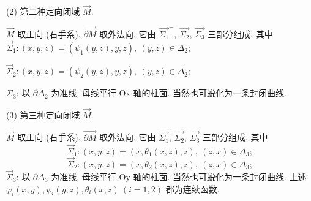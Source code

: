 \begin{figure}[htbp]
\begin{minipage}[b]{0.48\linewidth}
    \caption{}\label{fig:11.4.7}
  \end{minipage}
\end{figure}

(2) 第二种定向闭域 $\overrightarrow{M}$.

$\overrightarrow{M}$ 取正向 (右手系), $\overrightarrow{\partial M}$ 取外法向. 它由 $\overrightarrow{\Sigma_{1}}^{-}$, $\overrightarrow{\Sigma_{2}}$, $\overrightarrow{\Sigma_{3}}$ 三部分组成, 其中 $\overrightarrow{\Sigma}_{1}:(x,y,z)=(\psi_{1}(y,z),y,z),\ (y,z)\in\Delta_{2}$;

$\overrightarrow{\Sigma}_{2}:(x,y,z)=(\psi_{2}(y,z),y,z),\ (y,z)\in\Delta_{2}$;

$\Sigma_{3}$: 以 $\partial\Delta_{2}$ 为准线, 母线平行 Ox 轴的柱面. 当然也可蜕化为一条封闭曲线.

(3) 第三种定向闭域 $\overrightarrow{M}$.

$\overrightarrow{M}$ 取正向 (右手系), $\overrightarrow{\partial M}$ 取外法向. 它由 $\overrightarrow{\Sigma_{1}}$, $\overrightarrow{\Sigma_{2}}$, $\overrightarrow{\Sigma_{3}}$ 三部分组成, 其中
\[
\overrightarrow{\Sigma}_{1}:(x,y,z)=(x,\theta_{1}(x,z),z),\ (z,x)\in\Delta_{3};
\]
\[
\overrightarrow{\Sigma}_{2}:(x,y,z)=(x,\theta_{2}(x,z),z),\ (z,x)\in\Delta_{3};
\]
$\overrightarrow{\Sigma}_{3}$: 以 $\partial\Delta_{3}$ 为准线, 母线平行 Oy 轴的柱面. 当然也可蜕化为一条封闭曲线. 上述 $\varphi_{i}(x,y),\psi_{i}(y,z),\theta_{i}(x,z)\ (i=1,2)$ 都为连续函数.


